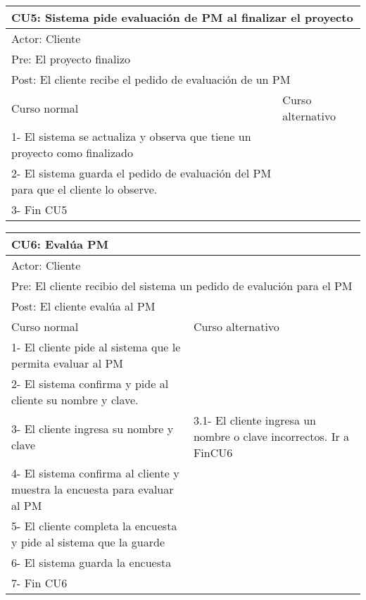 \begin{table}[H]
  \begin{adjustbox}{max width = \textwidth}
  \begin{tabular}{|l|l|}
    \hline
    \multicolumn{2}{|l|}{CU5: Sistema pide evaluación de PM al finalizar el proyecto} \\\hline
    \multicolumn{2}{|l|}{Actor: Cliente} \\\hline
    \multicolumn{2}{|l|}{Pre: El proyecto finalizo} \\\hline
    \multicolumn{2}{|l|}{Post: El cliente recibe el pedido de evaluación de un PM} \\\hline
     Curso normal & Curso alternativo\\ \hline
     1- El sistema se actualiza y observa que tiene un proyecto como finalizado & \\ \hline
     2- El sistema guarda el pedido de evaluación del PM para que el cliente lo observe. &\\ \hline
     3- Fin CU5 & \\ \hline
  \end{tabular}
  \end{adjustbox}
\end{table}

\begin{table}[H]
  \begin{adjustbox}{max width = \textwidth}
  \begin{tabular}{|l|l|}
    \hline
    \multicolumn{2}{|l|}{CU6: Evalúa PM} \\\hline
    \multicolumn{2}{|l|}{Actor: Cliente} \\\hline
    \multicolumn{2}{|l|}{Pre: El cliente recibio del sistema un pedido de evalución para el PM} \\\hline
    \multicolumn{2}{|l|}{Post: El cliente evalúa al PM} \\\hline
     Curso normal & Curso alternativo\\ \hline
     1- El cliente pide al sistema que le permita evaluar al PM & \\ \hline
     2- El sistema confirma y pide al cliente su nombre y clave. & \\ \hline
     3- El cliente ingresa su nombre y clave & 3.1- El cliente ingresa un nombre o clave incorrectos. Ir a FinCU6\\ \hline
     4- El sistema confirma al cliente y muestra la encuesta para evaluar al PM & \\ \hline
     5- El cliente completa la encuesta y pide al sistema que la guarde & \\ \hline
     6- El sistema guarda la encuesta & \\ \hline
     7- Fin CU6 & \\ \hline
  \end{tabular}
  \end{adjustbox}
\end{table}


